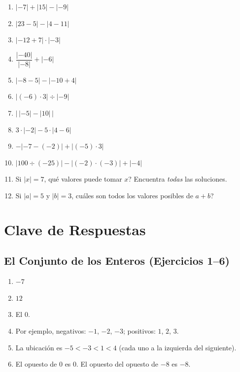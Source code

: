 \documentclass[12pt, letterpaper]{article}
\begin{document}
\begin{enumerate}[leftmargin=*, start=119]
  \item \medio{} $|-7| + |15| - |-9|$

  \item \medio{} $|23 - 5| - |4 - 11|$

  \item \medio{} $|-12 + 7| \cdot |-3|$

  \item \medio{} $\dfrac{|-40|}{|-8|} + |-6|$

  \item \dificil{} $|-8 - 5| - |-10 + 4|$

  \item \dificil{} $|(-6) \cdot 3| \div |-9|$

  \item \dificil{} $\big|\,|-5| - |10|\,\big|$

  \item \dificil{} $3 \cdot |-2| - 5 \cdot |4 - 6|$

  \item \dificil{} $-|-7 - (-2)| + |(-5) \cdot 3|$

  \item \dificil{} $|100 \div (-25)| - |(-2) \cdot (-3)| + |-4|$

  \item \dificil{} Si $|x| = 7$, \textquestiondown qué valores puede tomar $x$? Encuentra \emph{todas} las soluciones.

  \item \dificil{} Si $|a| = 5$ y $|b| = 3$, \textquestiondown cuáles son todos los valores posibles de $a + b$?
\end{enumerate}

\newpage

\ifmwclaves
\section{Clave de Respuestas}

\subsection*{El Conjunto de los Enteros (Ejercicios 1--6)}

\begin{enumerate}[leftmargin=*, label=\textbf{\arabic*.}]
  \item $-7$
  \item $12$
  \item El $0$.
  \item Por ejemplo, negativos: $-1$, $-2$, $-3$; positivos: $1$, $2$, $3$.
  \item La ubicación es $-5 < -3 < 1 < 4$ (cada uno a la izquierda del siguiente).
  \item El opuesto de $0$ es $0$. El opuesto del opuesto de $-8$ es $-8$.
\end{enumerate}
\end{document}
